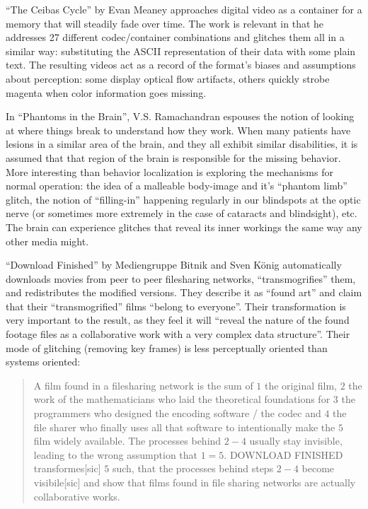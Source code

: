 \documentclass{thesis}
\begin{document}
	``The Ceibas Cycle'' by Evan Meaney\cite{evan_meaney_ceibas:_2008} approaches digital video as a container for a memory that will steadily fade over time. The work is relevant in that he addresses 27 different codec/container combinations and glitches them all in a similar way: substituting the ASCII representation of their data with some plain text. The resulting videos act as a record of the format's biases and assumptions about perception: some display optical flow artifacts, others quickly strobe magenta when color information goes missing.

	In ``Phantoms in the Brain''\cite{ramachandran_phantoms_1999}, V.S. Ramachandran espouses the notion of looking at where things break to understand how they work. When many patients have lesions in a similar area of the brain, and they all exhibit similar disabilities, it is assumed that that region of the brain is responsible for the missing behavior. More interesting than behavior localization is exploring the mechanisms for normal operation: the idea of a malleable body-image and it's ``phantom limb'' glitch, the notion of ``filling-in'' happening regularly in our blindspots at the optic nerve (or sometimes more extremely in the case of cataracts and blindsight), etc. The brain can experience glitches that reveal its inner workings the same way any other media might.
	
	``Download Finished'' by Mediengruppe Bitnik and Sven K\"onig\cite{!mediengruppe_bitnik_and_sven_knig_download_????} automatically downloads movies from peer to peer filesharing networks, ``transmogrifies'' them, and redistributes the modified versions. They describe it as ``found art'' and claim that their ``transmogrified'' films ``belong to everyone''. Their transformation is very important to the result, as they feel it will ``reveal the nature of the found footage files as a collaborative work with a very complex data structure''. Their mode of glitching (removing key frames) is less perceptually oriented than systems oriented:
	
	\begin{quote}
	A film found in a filesharing network is the sum of $1$ the original film, $2$ the work of the mathematicians who laid the theoretical foundations for $3$ the programmers who designed the encoding software / the codec and $4$ the file sharer who finally uses all that software to intentionally make the $5$ film widely available. The processes behind $2-4$ usually stay invisible, leading to the wrong assumption that $1=5$. DOWNLOAD FINISHED transformes[sic] $5$ such, that the processes behind steps $2-4$ become visibile[sic] and show that films found in file sharing networks are actually collaborative works.
	\end{quote}
	
\end{document}
